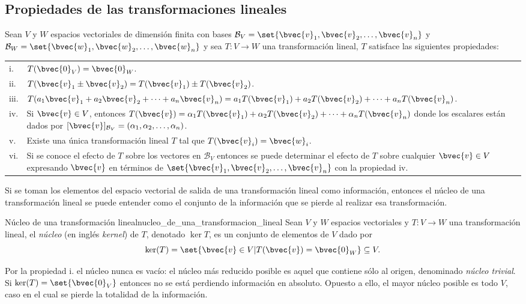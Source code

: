 \documentclass{fmbnotes}
\begin{document}
\subsection{Propiedades de las transformaciones lineales}
Sean \(V\) y \(W\) espacios vectoriales de dimensión finita con bases \(\mathcal{B}_V=\set{\bvec{v}_1,\bvec{v}_2,\ldots,\bvec{v}_n}\) y \(\mathcal{B}_W=\set{\bvec{w}_1,\bvec{w}_2,\ldots,\bvec{w}_n}\) y sea \(T:V\to W\) una transformación lineal, \(T\) satisface las siguientes propiedades:

\begin{longtable}{lp{\textwidth-1.8cm}}
	\rule[1ex]{0pt}{2.5ex}i.&\(T(\bvec{0}_V)=\bvec{0}_W\). \\
	\rule[1ex]{0pt}{2.5ex}ii.&\(T(\bvec{v}_1\pm\bvec{v}_2)=T(\bvec{v}_1)\pm T(\bvec{v}_2)\). \\
	\rule[1ex]{0pt}{2.5ex}iii.&\(T(a_1\bvec{v}_1+a_2\bvec{v}_2+\cdots+a_n\bvec{v}_n)=a_1T(\bvec{v}_1)+a_2T(\bvec{v}_2)+\cdots+a_nT(\bvec{v}_n)\). \\
	\rule[1ex]{0pt}{2.5ex}iv.& Si \(\bvec{v} \in V\), entonces \(T(\bvec{v})=\alpha_1T(\bvec{v}_1)+\alpha_2T(\bvec{v}_2)+\cdots+\alpha_nT(\bvec{v}_n)\) donde los escalares están dados por \([\bvec{v}]_{\mathcal{B}_V}=(\alpha_1,\alpha_2,\ldots,\alpha_n)\). \\
	\rule[1ex]{0pt}{2.5ex}v.&Existe una única transformación lineal \(T\) tal que \(T(\bvec{v}_i)=\bvec{w}_i\). \\
	\rule[1ex]{0pt}{2.5ex}vi.&Si se conoce el efecto de \(T\) sobre los vectores en \(\mathcal{B}_V\) entonces se puede determinar el efecto de \(T\) sobre cualquier \(\bvec{v}\in V\) expresando \( \bvec{v} \) en términos de \( \set{\bvec{v}_1,\bvec{v}_2,\ldots,\bvec{v}_n} \) con la propiedad iv. \\
\end{longtable}

Si se toman los elementos del espacio vectorial de salida de una transformación lineal como información, entonces el núcleo de una transformación lineal se puede entender como el conjunto de la información que se pierde al realizar esa transformación.
\begin{definicion}{Núcleo de una transformación lineal}{nucleo_de_una_transformacion_lineal}
	Sean \(V\) y \(W\) espacios vectoriales y \(T:V\to W\) una transformación lineal, el \emph{núcleo} (en inglés \textit{kernel}) de \(T\), denotado \(\ker T\), es un conjunto de elementos de \(V\) dado por
	\[\ker(T)=\set{\bvec{v}\in V | T(\bvec{v})=\bvec{0}_W} \subseteq V.\]
\end{definicion}
Por la propiedad i. el núcleo nunca es vacío: el núcleo más reducido posible es aquel que contiene sólo al origen, denominado \emph{núcleo trivial}. Si \(\ker(T)=\set{\bvec{0}_V}\) entonces no se está perdiendo información en absoluto. Opuesto a ello, el mayor núcleo posible es todo \(V\), caso en el cual se pierde la totalidad de la información.
\end{document}
